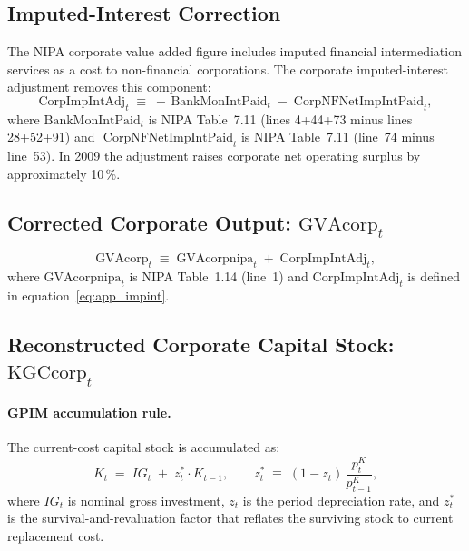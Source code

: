 
\subsection{Imputed-Interest Correction}

The NIPA corporate value added figure includes imputed financial
intermediation services as a cost to non-financial corporations. The
corporate imputed-interest adjustment removes this component:
%
\begin{equation}
	\label{eq:app_impint}
	\text{CorpImpIntAdj}_t
	\;\equiv\;
	-\,\text{BankMonIntPaid}_t
	\;-\; \text{CorpNFNetImpIntPaid}_t,
\end{equation}
%
where $\text{BankMonIntPaid}_t$ is NIPA Table~7.11
(lines 4+44+73 minus lines 28+52+91) and
$\, \, \text{CorpNFNetImpIntPaid}_t$ is NIPA Table~7.11 (line~74 minus line~53).
In 2009 the adjustment raises corporate net operating surplus by
approximately 10\,\%.


\subsection{Corrected Corporate Output: \texorpdfstring{$\text{GVAcorp}_t$}{GVAcorp}}

\begin{equation}
	\label{eq:app_gva}
	\text{GVAcorp}_t
	\;\equiv\;
	\text{GVAcorpnipa}_t \;+\; \text{CorpImpIntAdj}_t,
\end{equation}
%
where $\text{GVAcorpnipa}_t$ is NIPA Table~1.14 (line~1) and
$\text{CorpImpIntAdj}_t$ is defined in equation~\eqref{eq:app_impint}.


\subsection{Reconstructed Corporate Capital Stock: \texorpdfstring{$\text{KGCcorp}_t$}{KGCcorp}}

\paragraph{GPIM accumulation rule.}
The current-cost capital stock is accumulated as:
%
\begin{equation}
	\label{eq:app_gpim}
	K_t \;=\; IG_t \;+\; z_t^* \cdot K_{t-1},
	\qquad
	z_t^* \;\equiv\; (1 - z_t)\,\frac{p^K_t}{p^K_{t-1}},
\end{equation}
%
where $IG_t$ is nominal gross investment, $z_t$ is the period depreciation
rate, and $z_t^*$ is the survival-and-revaluation factor that reflates the
surviving stock to current replacement cost.

